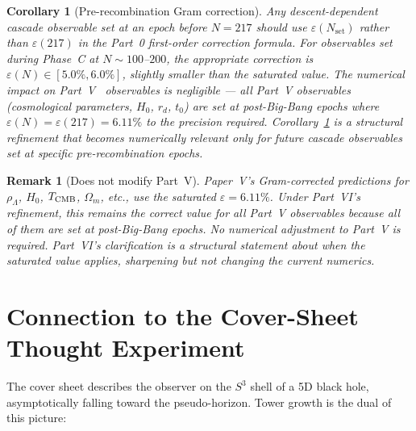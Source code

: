 \documentclass[12pt,a4paper]{article}
\newtheorem{corollary}[theorem]{Corollary}
\newtheorem*{remark}{Remark}
\begin{document}
\begin{corollary}[Pre-recombination Gram correction]\label{cor:pre-rec-gram}
Any descent-dependent cascade observable set at an epoch before $N = 217$
should use $\varepsilon(N_{\mathrm{set}})$ rather than $\varepsilon(217)$ in
the Part~0 first-order correction formula. For observables set
during Phase~C at $N \sim 100$--$200$, the appropriate correction is
$\varepsilon(N) \in [5.0\%, 6.0\%]$, slightly smaller than the saturated
value. The numerical impact on Part~V~\cite{part5} observables is
negligible --- all Part~V observables (cosmological parameters, $H_0$, $r_d$,
$t_0$) are set at post-Big-Bang epochs where $\varepsilon(N) =
\varepsilon(217) = 6.11\%$ to the precision required.
Corollary~\ref{cor:pre-rec-gram} is a structural refinement that becomes
numerically relevant only for future cascade observables set at specific
pre-recombination epochs.
\end{corollary}

\begin{remark}[Does not modify Part~V]
Paper~V's Gram-corrected predictions for $\rho_\Lambda$, $H_0$, $T_{\rm CMB}$,
$\Omega_m$, etc., use the saturated $\varepsilon = 6.11\%$. Under Part~VI's
refinement, this remains the correct value for all Part~V observables because
all of them are set at post-Big-Bang epochs. No numerical adjustment to
Part~V is required. Part~VI's clarification is a structural statement about
\emph{when} the saturated value applies, sharpening but not changing the
current numerics.
\end{remark}

\section{Connection to the Cover-Sheet Thought Experiment}
\label{sec:coversheet}

The cover sheet describes the observer on the $S^3$ shell of a 5D black hole,
asymptotically falling toward the pseudo-horizon. Tower growth is the dual of
this picture:

\begin{center}
\renewcommand{\arraystretch}{1.25}
\end{center}
\end{document}
